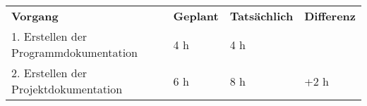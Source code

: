\begin{tabular}{llll}
\rowcolor{heading}\textbf{Vorgang} & \textbf{Geplant} & \textbf{Tatsächlich} & \textbf{Differenz} \\
1. Erstellen der Programmdokumentation & 4 h   & 4 h   &  \\
\rowcolor{odd}2. Erstellen der Projektdokumentation & 6 h   & 8 h   & +2 h \\
\end{tabular}
